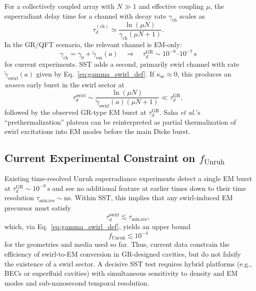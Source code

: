 \documentclass[10pt,reprint,aps,onecolumn,nofootinbib]{revtex4-2}
\begin{document}
    For a collectively coupled array with $N\gg 1$ and effective coupling
    $\mu$, the superradiant delay time for a channel with decay rate
    $\gamma_{\text{ch}}$ scales as \cite{GrossHaroche1982,Deswal2025}
    \begin{equation}
        \tau_d^{(\text{ch})}
        \simeq \frac{\ln(\mu N)}{\gamma_{\text{ch}}(\mu N + 1)}.
    \end{equation}
    In the GR/QFT scenario, the relevant channel is EM-only:
    \begin{equation}
        \gamma_{\text{ch}} = \gamma_0 + \tilde\gamma_{\text{em}}(a)
        \quad\Rightarrow\quad
        \tau_d^{\text{GR}} \sim 10^{-8}\text{--}10^{-7}\,\mathrm{s}
    \end{equation}
    for current experiments. SST adds a second, primarily swirl channel with
    rate $\tilde\gamma_{\text{swirl}}(a)$ given by
    Eq.~\eqref{eq:gamma_swirl_def}. If $\kappa_{\text{se}}\approx 0$, this
    produces an \emph{unseen} early burst in the swirl sector at
    \begin{equation}
        \tau_d^{\text{swirl}}
        \sim \frac{\ln(\mu N)}{\tilde\gamma_{\text{swirl}}(a)(\mu N + 1)}
        \ll \tau_d^{\text{GR}},
    \end{equation}
    followed by the observed GR-type EM burst at $\tau_d^{\text{GR}}$.
    Saha \emph{et al.}'s ``prethermalization'' plateau \cite{Saha2025} can be
    reinterpreted as partial thermalization of swirl excitations into EM modes
    before the main Dicke burst.

\subsection{Current Experimental Constraint on $f_{\text{Unruh}}$}

    Existing time-resolved Unruh superradiance experiments
    \cite{Lochan2020,WangBlencowe2021,Deswal2025,Zheng2025,Saha2025} detect a
    single EM burst at $\tau_d^{\text{GR}}\sim10^{-8}\,\mathrm{s}$ and see no
    additional feature at earlier times down to their time resolution
    $\tau_{\text{min,res}}\sim \mathrm{ns}$. Within SST, this implies that any
    swirl-induced EM precursor must satisfy
    \begin{equation}
        \tau_d^{\text{swirl}} \lesssim \tau_{\text{min,res}},
    \end{equation}
    which, via Eq.~\eqref{eq:gamma_swirl_def}, yields an upper bound
    \begin{equation}
        f_{\text{Unruh}} \lesssim 10^{-4}
    \end{equation}
    for the geometries and media used so far. Thus, current data constrain the
    efficiency of swirl-to-EM conversion in GR-designed cavities, but do not
    falsify the existence of a swirl sector. A decisive SST test requires
    hybrid platforms (e.g., BECs or superfluid cavities) with simultaneous
    sensitivity to density and EM modes \cite{Steinhauer2016,Gooding2020} and
    sub-nanosecond temporal resolution.
\end{document}
